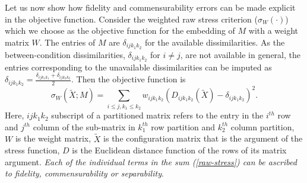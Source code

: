 \documentclass[12pt]{article} %
\begin{document}
Let us now show how fidelity and commensurability errors  can be made explicit in the objective function. Consider the weighted raw stress criterion ($\sigma_{W}(\cdot)$) which we choose as the objective function for the embedding  of  $M$ with a weight matrix $W$. The entries of $M$ are $\delta_{ijk_1k_2}$ for the available dissimilarities. As the between-condition dissimilarities, 
$\delta_{ijk_1k_2}$ for $i\neq j$, are  not available in general, the entries corresponding to the unavailable dissimilarities can be imputed as $
\delta_{ijk_1k_2}=\frac{\delta_{ijk_1k_1}+\delta_{ijk_2k_2}}{2} \label{impute}$. Then the objective function is
\begin{equation}
\sigma_{W}(\widetilde{X};M)=\sum_{i\leq j,k_1\leq k_2} {w_{ijk_1k_2}(D_{ijk_1k_2}(\widetilde{X})-\delta_{ijk_1k_2})^2  }\label{raw-stress}.
\end{equation}
 Here, $ijk_1k_2$ subscript of a partitioned matrix refers to the entry in the $i^{th}$ row and $j^{th}$ column of the sub-matrix in $k_1^{th}$ row partition and $k_2^{th}$ column partition, $W$ is the weight matrix, $\widetilde{X}$ is the configuration matrix that is the argument of the stress function, $D$ is the Euclidean distance function of the rows of its matrix argument.   \emph{Each of the individual terms in the sum \textrm{(\ref{raw-stress})} can be ascribed to fidelity, commensurability or separability}. %

\end{document}
